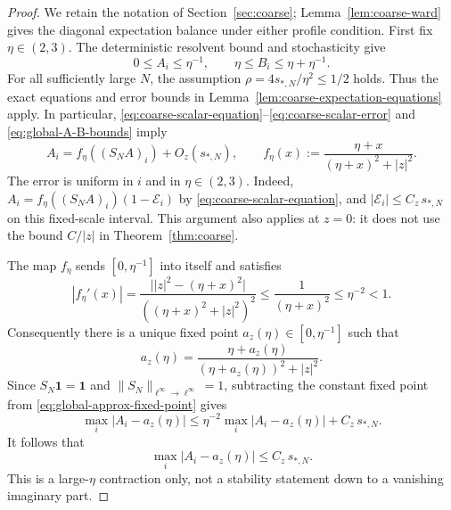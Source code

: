 \documentclass[10pt,a4paper]{amsart}
\begin{document}
\begin{proof}
We retain the notation of Section~\ref{sec:coarse};
Lemma~\ref{lem:coarse-ward} gives the diagonal expectation balance under
either profile condition.  First fix
$\eta\in(2,3)$.  The deterministic resolvent bound and stochasticity give
\begin{equation}\label{eq:global-A-B-bounds}
 0\le A_i\le\eta^{-1},\qquad
 \eta\le B_i\le\eta+\eta^{-1}.
\end{equation}
For all sufficiently large $N$, the assumption
$\rho=4s_{*,N}/\eta^2\le1/2$ holds.  Thus the exact equations and error
bounds in Lemma~\ref{lem:coarse-expectation-equations} apply.  In
particular, \eqref{eq:coarse-scalar-equation}--\eqref{eq:coarse-scalar-error}
and \eqref{eq:global-A-B-bounds} imply
\begin{equation}\label{eq:global-approx-fixed-point}
 A_i=f_\eta((S_NA)_i)+O_z(s_{*,N}),\qquad
 f_\eta(x):=\frac{\eta+x}{(\eta+x)^2+|z|^2}.
\end{equation}
The error is uniform in $i$ and in $\eta\in(2,3)$.  Indeed,
$A_i=f_\eta((S_NA)_i)(1-\mathcal E_i)$ by
\eqref{eq:coarse-scalar-equation}, and
$|\mathcal E_i|\le C_z\,s_{*,N}$ on this fixed-scale interval.  This
argument also applies at $z=0$: it does not use the bound $C/|z|$ in
Theorem~\ref{thm:coarse}.

The map $f_\eta$ sends $[0,\eta^{-1}]$ into itself and satisfies
\[
 |f_\eta'(x)|
 =\frac{\bigl||z|^2-(\eta+x)^2\bigr|}
        {((\eta+x)^2+|z|^2)^2}
 \le\frac1{(\eta+x)^2}\le\eta^{-2}<1.
\]
Consequently there is a unique fixed point
$a_z(\eta)\in[0,\eta^{-1}]$ such that
\begin{equation}\label{eq:global-scalar-fixed-point}
 a_z(\eta)=\frac{\eta+a_z(\eta)}
 {(\eta+a_z(\eta))^2+|z|^2}.
\end{equation}
Since $S_N\mathbf1=\mathbf1$ and
$\|S_N\|_{\ell^\infty\to\ell^\infty}=1$, subtracting the constant fixed
point from \eqref{eq:global-approx-fixed-point} gives
\[
 \max_i|A_i-a_z(\eta)|
 \le\eta^{-2}\max_i|A_i-a_z(\eta)|+C_z\,s_{*,N}.
\]
It follows that
\begin{equation}\label{eq:global-mean-convergence}
 \max_i|A_i-a_z(\eta)|\le C_z\,s_{*,N}.
\end{equation}
This is a large-$\eta$ contraction only, not a stability statement down to
a vanishing imaginary part.


\end{proof}
\end{document}
